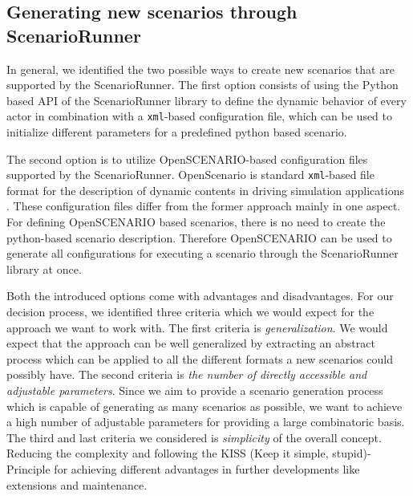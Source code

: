 \documentclass[conference, 11pt]{IEEEtran}
\begin{document}
\subsection{Generating new scenarios through ScenarioRunner}
In general, we identified the two possible ways to create new scenarios that are supported by the ScenarioRunner.
The first option consists of using the Python based API of the ScenarioRunner library to define the dynamic behavior of every actor in combination with a \texttt{xml}-based configuration file, which can be used to initialize different parameters for a predefined python based scenario.

The second option is to utilize  OpenSCENARIO-based configuration files supported by the ScenarioRunner. OpenScenario is standard \texttt{xml}-based file format for the description of dynamic contents in driving simulation applications \cite{OpenScenario}. These configuration files differ from the former approach mainly in one aspect. For defining OpenSCENARIO based scenarios, there is no need to create the python-based scenario description. Therefore OpenSCENARIO can be used to generate all configurations for executing a scenario through the ScenarioRunner library at once. 

Both the introduced options come with advantages and disadvantages. For our decision process, we identified three criteria which we would expect for the approach we want to work with. 
The first criteria is  \textit{generalization}. We would expect that the approach can be well generalized by extracting an abstract process which can be applied to all the different formats a new scenarios could possibly have.
The second criteria is \textit{the number of directly  accessible and adjustable parameters}. Since we aim to provide a scenario generation process which is capable of generating as many scenarios as possible, we want to achieve a high number of adjustable parameters for providing a large combinatoric basis.
The third and last criteria we considered is \textit{simplicity} of the overall concept. Reducing the complexity and  following the KISS (Keep it simple, stupid)-Principle for achieving different advantages in further developments like extensions and maintenance. 
\end{document}
